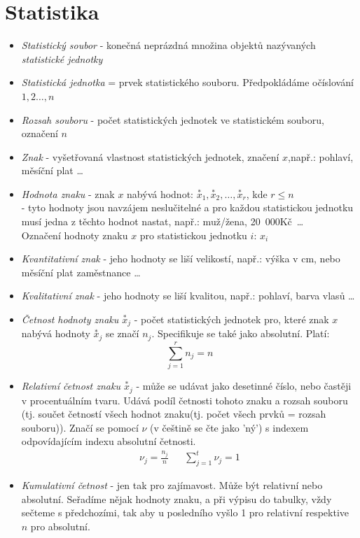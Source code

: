 \documentclass[12pt]{article}
\begin{document}
\section{Statistika}
\begin{itemize}
\item \emph{Statistický soubor} - konečná neprázdná množina objektů nazývaných \emph{statistické jednotky}
\item \emph{Statistická jednotka} = prvek statistického souboru. Předpokládáme očíslování $1,2 \dotsc, n $
\item \emph{Rozsah souboru} - počet statistických jednotek ve statistickém souboru, označení $n$
\item \emph{Znak} - vyšetřovaná vlastnost statistických jednotek, značení $x$,např.: pohlaví, měsíční plat \dots
\item \emph{Hodnota znaku} - znak $x$ nabývá hodnot: $\overset{*}{x}_1,\overset{*}{x}_2, \dots , \overset{*}{x}_r$, kde $r \leq n$\\
 - tyto hodnoty jsou navzájem neslučitelné a pro každou statistickou jednotku musí jedna z těchto hodnot  nastat, např.: muž/žena, 20~000Kč~\dots \\Označení hodnoty znaku $x$ pro statistickou jednotku $i$: $x_i$
 \item \emph{Kvantitativní znak} - jeho hodnoty se liší velikostí, např.: výška v cm, nebo měsíční plat zaměstnance \dots
 \item \emph{Kvalitativní znak} - jeho hodnoty se liší kvalitou, např.: pohlaví, barva vlasů \dots
 \item \emph{Četnost hodnoty znaku $\overset{*}{x}_j$} - počet statistických jednotek pro, které znak $x$ nabývá hodnoty $\overset{*}{x}_j$ se značí $n_j$. Specifikuje se také jako absolutní. Platí:
 \begin{equation}
 \sum^r_{j=1} n_j = n
\end{equation}
 \item \emph{Relativní četnost znaku $\overset{*}{x}_j$} - může se udávat jako desetinné číslo, nebo častěji v procentuálním tvaru. Udává podíl četnosti tohoto znaku a rozsah souboru (tj. součet četností všech hodnot znaku(tj. počet všech prvků = rozsah souboru)). Značí se pomocí $\nu$ (v češtině se čte jako 'ný') s indexem odpovídajícím indexu absolutní četnosti.
 \begin{align}
 \nu_j = \frac{n_j}{n} && \sum^t_{j=1} \nu_j = 1
 \end{align}
\item \emph{Kumulativní četnost} - jen tak pro zajímavost. Může být relativní nebo absolutní. Seřadíme nějak hodnoty znaku, a při výpisu do tabulky, vždy sečteme s předchozími, tak aby u posledního vyšlo 1 pro relativní respektive $n$ pro absolutní.
\end{itemize}
\end{document}
